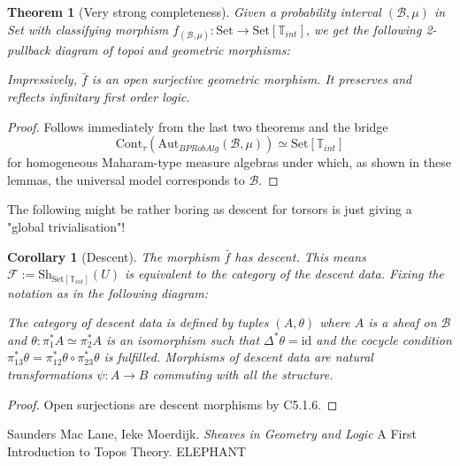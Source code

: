 \documentclass[a4paper]{amsproc}
\theoremstyle{plain}
\newtheorem{theorem}{Theorem}[section]
\newtheorem{corollary}{Corollary}[section]
\theoremstyle{definition}
\theoremstyle{remark}
\numberwithin{equation}{section}
\begin{document}
\begin{theorem}[Very strong completeness] Given a probability interval $(\mathcal{B},\mu)$ in Set with classifying morphism $f_{(\mathcal{B},\mu)}:\text{Set}\rightarrow \text{Set}[\mathbb{T}_{int}]$, we get the following 2-pullback diagram of topoi and geometric morphisms:
\begin{center}
\end{center}
Impressively, $\bar{f}$ is an open surjective geometric morphism. It preserves and reflects infinitary first order logic.
\end{theorem}
\begin{proof} 
Follows immediately from the last two theorems and the bridge 
\[\text{Cont}_\tau(\text{Aut}_{BPRobAlg}(\mathcal{B},\mu))\simeq \text{Set}[\mathbb{T}_{int}]\]
 for homogeneous Maharam-type measure algebras under which, as shown in these lemmas, the universal model corresponds to $\mathcal{B}$.%
\end{proof}
The following might be rather boring as descent for torsors is just giving a "global trivialisation"!
\begin{corollary}[Descent] The morphism $\bar{f}$ has descent. This means $\mathcal{F}:=\text{Sh}_{\text{Set}[\mathbb{T}_{int}]}(U)$ is equivalent to the category of the descent data.
Fixing the notation as in the following diagram:
\begin{center}
\end{center}
The category of descent data is defined by tuples $(A,\theta)$ where $A$ is a sheaf on $\mathcal{B}$ and $\theta:\pi_1^*A\simeq \pi_2^*A$ is an isomorphism such that $\Delta^*\theta=\text{id}$ and the cocycle condition $\pi_{13}^*\theta=\pi_{12}^*\theta\circ \pi_{23}^*\theta$ is fulfilled. Morphisms of descent data are natural transformations $\psi:A\rightarrow B$ commuting with all the structure.
\end{corollary}
\begin{proof} Open surjections are descent morphisms by C5.1.6.
\end{proof}


\begin{thebibliography}{9}
Saunders Mac Lane, Ieke Moerdijk. \textit{Sheaves in Geometry and Logic} A First Introduction to Topos Theory.
ELEPHANT
\end{thebibliography}
\end{document}
